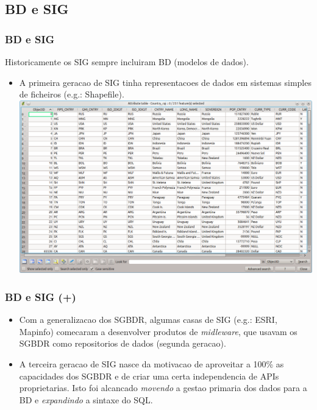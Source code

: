 \documentclass[hyperref={pdfpagelabels=true}]{beamer}
\begin{document}
\subsection{BD e SIG} 
\begin{frame}
\frametitle{BD e SIG}
Historicamente os SIG sempre incluiram BD (modelos de dados).
    \begin{itemize}
      \item<2-> A primeira geracao de SIG tinha representacoes de dados em sistemas simples de ficheiros (e.g.: Shapefile).      
      \includegraphics[scale=0.2]{att_table.png}
      \end{itemize}
\end{frame}

\begin{frame}
\frametitle{BD e SIG (+)}
    \begin{itemize}
      \item<1-> Com a generalizacao dos SGBDR, algumas casas de SIG (e.g.: ESRI, Mapinfo) comecaram a desenvolver produtos de \textit{midleware}, que usavam os SGBDR como repositorios de dados (segunda geracao).
      \item<2-> A terceira geracao de SIG nasce da motivacao de aproveitar a 100\% as capacidades dos SGBDR e de criar uma certa independencia de APIs proprietarias.
      Isto foi alcancado \textit{movendo} a gestao primaria dos dados para a BD e \textit{expandindo} a sintaxe do SQL.
      \end{itemize}
\end{frame}
\end{document}
